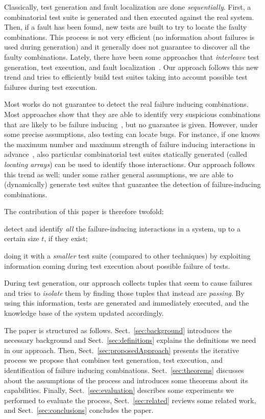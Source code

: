 \documentclass[
12pt, %
oneside, %
english, %
singlespacing, %
headsepline, %
consistentlayout, %
]{MastersDoctoralThesis} %
\theoremstyle{plain}
\theoremstyle{definition}
\theoremstyle{remark}
\theoremstyle{plain}
\theoremstyle{plain}
\theoremstyle{remark}
\begin{document}
Classically, test generation and fault localization are done \emph{sequentially}. First, a combinatorial test suite is generated and then executed against the real system. Then, if a fault has been found, new tests are built to try to locate the faulty combinations. This process is not very efficient (no information about failures is used during generation) and it generally does not guarantee to discover all the faulty combinations. Lately, there have been some approaches that \emph{interleave} test generation, test execution, and fault localization~\cite{Niu2018interleaving}. Our approach follows this new trend and tries to efficiently build test suites taking into account possible test failures during test execution.

Most works do not guarantee to detect the real failure inducing combinations. Most approaches show that they are able to identify very suspicious combinations that are likely to be failure inducing~\cite{ben_2015}, but no guarantee is given. However, under some precise assumptions, also testing can locate bugs. For instance, if one knows the maximum number and maximum strength of failure inducing interactions in advance~\cite{colbourn_locating_2008}, also particular combinatorial test suites statically generated (called {\it locating arrays}) can be used to identify those interactions. Our approach follows this trend as well: under some rather general assumptions, we are able to (dynamically) generate test suites that guarantee the detection of failure-inducing combinations.

The contribution of this paper is therefore twofold:
%
\begin{compactenum}
	\item detect and identify \textit{all} the failure-inducing interactions in a system, up to a certain size $t$, if they exist;
	\item doing it with a \textit{smaller} test suite (compared to other techniques) by exploiting information coming during test execution about possible failure of tests.
\end{compactenum}

During test generation, our approach collects tuples that seem to cause failures and tries to \emph{isolate} them by finding those tuples that instead are \emph{passing}. By using this information, tests are generated and immediately executed, and the knowledge base of the system updated accordingly.

The paper is structured as follows. Sect.~\ref{sec:background} introduces the necessary background and Sect.~\ref{sec:definitions} explains the definitions we need in our approach. Then, Sect.~\ref{sec:proposedApproach} presents the iterative process we propose that combines test generation, test execution, and identification of failure inducing combinations. Sect.~\ref{sec:theorems} discusses about the assumptions of the process and introduces some theorems about its capabilities. Finally, Sect.~\ref{sec:evaluation} describes some experiments we performed to evaluate the process, Sect.~\ref{sec:related} reviews some related work, and Sect.~\ref{sec:conclusions} concludes the paper.
\end{document}
